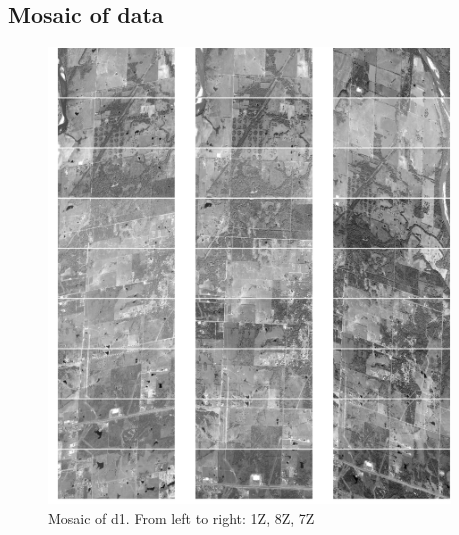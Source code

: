 \documentclass[paper=a4, fontsize=11pt, onecolumn, tikz, dvipsnames, svgnames, x11names]{article}
\begin{document}
 \newpage
\subsection{Mosaic of data}

 \begin{figure}[H]
     \centering
     \includegraphics[width = 0.95\textwidth]{d1.png}
     \caption{Mosaic of d1. From left to right: 1Z, 8Z, 7Z}
     \label{fig_mosaic_d1}
 \end{figure}
\end{document}
